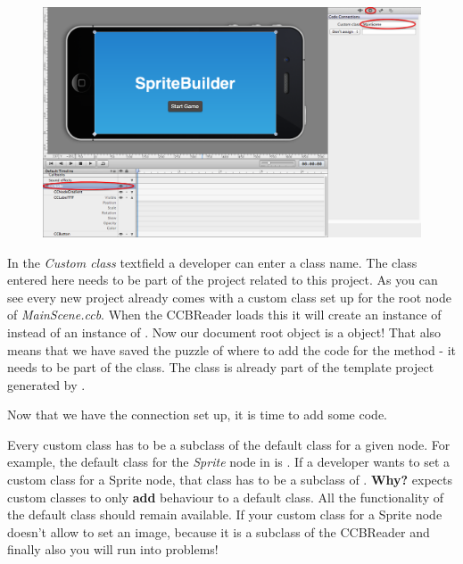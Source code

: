 \begin{figure}[H]
		\centering
		\includegraphics[width=0.9\linewidth]{images/firstproject/custom_class.png}
\end{figure}

In the \textit{Custom class} textfield a developer can enter a class name. The
class entered here needs to be part of the \xcode{} project related to this
\SB{} project. As you can see every new \SB{} project already comes with a
custom class set up for the root node of \textit{MainScene.ccb}. When the
CCBReader loads this \ccbfile{} it will create an instance of  instead of an instance of
.
Now our document root object is a  object! That also means
that we have saved the puzzle of where to add the code for the
 method - it needs to be part of the
 class. The  class is already part
of the template \xcode{} project generated by \SB{}.

Now that we have the connection set up, it is time to add some code.

\begin{details} 
Every custom class has to be a subclass of the default class for a given node.
For example, the default class for the \textit{Sprite} node in \SB{} is
\ccsprite{}. If a developer wants to set a custom class for a Sprite node, that
class has to be a subclass of \ccsprite{}. \textbf{Why?} \SB{} expects custom
classes to only \textbf{add} behaviour to a default class. All the functionality
of the default class should remain available. If your custom class for a Sprite
node doesn't allow \SB{} to set an image, because it is a subclass of \ccnode{}
the CCBReader and finally also you will run into problems!
\end{details}


